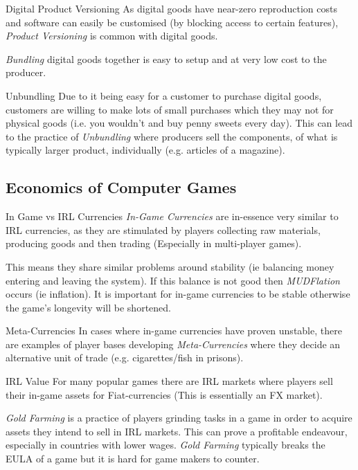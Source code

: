\documentclass[11pt,a4paper]{article}
\begin{document}
  \begin{remark}{Digital Product Versioning}
    As digital goods have near-zero reproduction costs and software can easily be customised (by blocking access to certain features), \textit{Product Versioning} is common with digital goods.
    \par \textit{Bundling} digital goods together is easy to setup and at very low cost to the producer.
  \end{remark}

  \begin{proposition}{Unbundling}
    Due to it being easy for a customer to purchase digital goods, customers are willing to make lots of small purchases which they may not for physical goods (i.e. you wouldn't and buy penny sweets every day). This can lead to the practice of \textit{Unbundling} where producers sell the components, of what is typically larger product, individually (e.g. articles of a magazine).
  \end{proposition}

\subsection{Economics of Computer Games} \label{sec_EconomicsOfComputerGames}

  \begin{remark}{In Game vs IRL Currencies}
    \textit{In-Game Currencies} are in-essence very similar to IRL currencies, as they are stimulated by players collecting raw materials, producing goods and then trading (Especially in multi-player games).
    \par This means they share similar problems around stability (ie balancing money entering and leaving the system). If this balance is not good then \textit{MUDFlation} occurs (ie inflation). It is important for in-game currencies to be stable otherwise the game's longevity will be shortened.
  \end{remark}

  \begin{remark}{Meta-Currencies}
    In cases where in-game currencies have proven unstable, there are examples of player bases developing \textit{Meta-Currencies} where they decide an alternative unit of trade (e.g. cigarettes/fish in prisons).
  \end{remark}

  \begin{remark}{IRL Value}
    For many popular games there are IRL markets where players sell their in-game assets for Fiat-currencies (This is essentially an FX market).
    \par \textit{Gold Farming} is a practice of players grinding tasks in a game in order to acquire assets they intend to sell in IRL markets. This can prove a profitable endeavour, especially in countries with lower wages. \textit{Gold Farming} typically breaks the EULA of a game but it is hard for game makers to counter.
  \end{remark}
\end{document}
